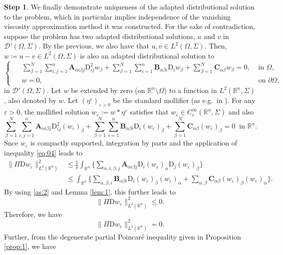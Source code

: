 \documentclass{amsart}
\numberwithin{equation}{section}
\numberwithin{thm}{section}
\theoremstyle{definition}
\newtheorem{proofpart}{Step}
\def\Om{\Omega}
\renewcommand{\:}{\!:\!} %
\newcommand{\e}{\varepsilon}
\newcommand{\Si}{\Sigma}
\renewcommand{\^}[1]{^{#1}_{\phantom{l}}}
\begin{document}
\begin{proofpart}
We finally demonstrate uniqueness of the adapted distributional solution to the problem, which in particular implies independence of the vanishing viscosity approximation method it was constructed. For the sake of contradiction, suppose the problem has two adapted distributional solutions, $u$ and $v$ in $\mathscr{D}'(\Omega, \Sigma)$. By the previous, we also have that  $u,v \in L^2(\Om,\Si)$. Then, $w \coloneqq u - v \in L^{2}(\Omega, \Sigma)$ is also an adapted distributional  solution to
\[
\left\{ \ \
\begin{split}
&\sum_{\beta = 1}^{N}\sum_{i, j = 1}^{n} \mathbf{A}_{\alpha i \beta j}\mathrm{D}_{ij}^{2}w_{\beta} + \sum_{\beta = 1}^{N} \sum_{i=1}^{n} \mathbf{B}_{\alpha \beta i}\mathrm{D}_{i}w_{\beta} + \sum_{\beta = 1}^{N} \mathbf{C}_{\alpha \beta}w_{\beta} = 0,  & \text{ in $\Omega$}, 
\\ 
&w = 0, & \text{ on $\partial \Omega$},
\end{split}
\right.
\]
in $\mathscr{D}'(\Omega, \Sigma)$. Let $w$ be extended by zero (on $\mathbb{R}^{n} \setminus \Omega$) to a function in $L^{2}(\mathbb{R}^{n} , \Sigma)$, also denoted by $w$. Let $(\eta^\e)_{\e>0}$ be the standard mollifier (as e.g.\ in \cite{EG}). For any $\varepsilon > 0$, the mollified solution ${w_{\varepsilon}} := w \ast \eta^{\varepsilon}$ satisfies that ${w_{\varepsilon}} \in C^{\infty}_{c}(\mathbb{R}^{n}, \Sigma)$ and also
\[
\sum_{\beta = 1}^{N}\sum_{i, j = 1}^{n} \mathbf{A}_{\alpha i \beta j}\mathrm{D}_{ij}^{2}({w_{\varepsilon}})_{\beta} + \sum_{\beta = 1}^{N} \sum_{i=1}^{n} \mathbf{B}_{\alpha \beta i}\mathrm{D}_{i}({w_{\varepsilon}})_{\beta} + \sum_{\beta = 1}^{N} \mathbf{C}_{\alpha \beta}({w_{\varepsilon}})_{\beta} = 0 \ \text{ in $\mathbb{R}^n.$}
\]
Snce $w_\e$ is compactly supported, integration by parts and the application of inequality \eqref{eq:04} leads to
\[
\begin{split}
\| \Pi \mathrm{D} {w_{\varepsilon}} \| _{L^{2}(\mathbb{R}^{n})}^{2} 
&\leq 
\frac{1}{\nu} \int_{\mathbb{R}^n}\biggl\{\sum_{\alpha, i, \beta, j} \mathbf{A}_{\alpha i \beta j}\mathrm{D}_{i}({w_{\varepsilon}})_{\alpha}\mathrm{D}_{j}({w_{\varepsilon}})_{\beta} \bigg\}
\\
&\leq \int_{\mathbb{R}^n}\biggl\{ \sum_{\alpha, \beta, i} \mathbf{B}_{\alpha \beta i}\mathrm{D}_{i}({w_{\varepsilon}})_{\beta}({w_{\varepsilon}})_{\alpha}  + \sum_{\alpha, \beta} \mathbf{C}_{\alpha \beta}({w_{\varepsilon}})_{\beta}({w_{\varepsilon}})_{\alpha} \biggl\}.
\end{split}
\]
By using \eqref{as:2} and Lemma \ref{lem:1}, this further leads to
\[
\| \Pi \mathrm{D} {w_{\varepsilon}} \| _{L^{2}(\mathbb{R}^{n})}^{2} \leq 0.
\]
Therefore, we have
\[
\| \Pi \mathrm{D} {w_{\varepsilon}} \| _{L^{2}(\mathbb{R}^{n})}^{2} = 0.
\]
Further, from the degenerate partial Poincar\'e inequality given in Proposition \ref{prop:1}, we have


\end{proofpart}
\end{document}
